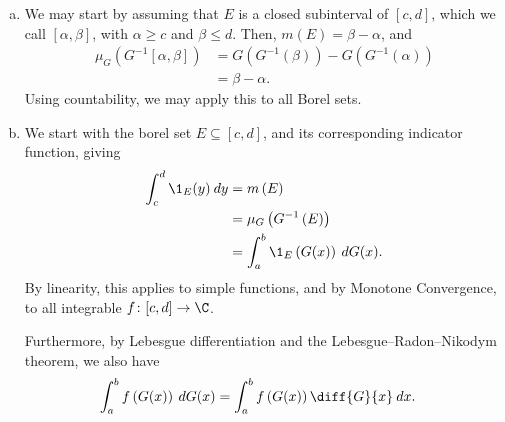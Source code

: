 \documentclass[10pt]{mypackage}
\begin{document}
\begin{solution}\hfill
  \begin{enumerate}[(a)]
    \item We may start by assuming that $E$ is a closed subinterval of $\left[ c,d \right]$, which we call $\left[ \alpha,\beta \right]$, with $\alpha \geq c$ and $\beta \leq d$. Then, $m\left( E \right) = \beta-\alpha$, and 
      \begin{align*}
        \mu_G\left( G^{-1}\left[ \alpha,\beta \right] \right) &= G\left( G^{-1}\left( \beta \right) \right) - G\left( G^{-1}\left( \alpha \right) \right)\\
                                                              &= \beta-\alpha.
      \end{align*}
      Using countability, we may apply this to all Borel sets.
    \item We start with the borel set $E\subseteq [c,d]$, and its corresponding indicator function, giving
      \begin{align*}
        \int_{c}^{d} \1_E(y)\:dy &= m\left( E \right)\\
                                 &= \mu_G\left( G^{-1}\left( E \right) \right)\\
                                 &= \int_{a}^{b} \1_E\left( G(x) \right)\:dG(x).
      \end{align*}
      By linearity, this applies to simple functions, and by Monotone Convergence, to all integrable $f\colon [c,d]\rightarrow \C$.\newline

      Furthermore, by Lebesgue differentiation and the Lebesgue--Radon--Nikodym theorem, we also have
      \begin{align*}
        \int_{a}^{b} f\left( G(x) \right)\:dG(x) &= \int_{a}^{b} f\left( G(x) \right)\diff{G}{x}\:dx.
      \end{align*}
  \end{enumerate}
\end{solution}
\end{document}
